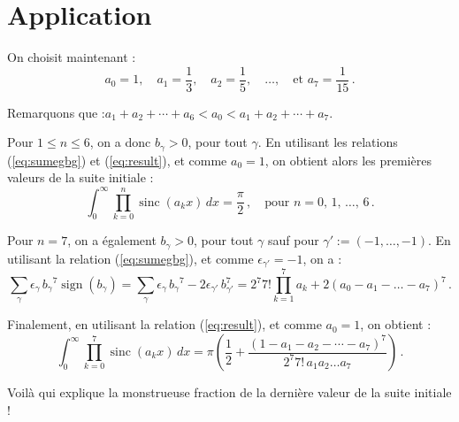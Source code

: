 \documentclass[a4paper,11pt]{article}
\newcommand{\g}{\ensuremath{\gamma}\xspace}
\newcommand{\bg}{\ensuremath{b_{\gamma}}\xspace}
\newcommand{\eg}{\ensuremath{\epsilon_{\gamma}}\xspace}
\DeclareMathOperator{\sinc}{sinc}
\DeclareMathOperator{\sign}{sign}
\begin{document}
\section{Application}

On choisit maintenant :
\[
  a_0=1,\quad a_1=\frac{1}{3},\quad a_2=\frac{1}{5},
  \quad\ldots,\quad \text{et }  a_7=\frac{1}{15} \,.
\]

Remarquons que :\quad $a_1+a_2+\cdots+a_6<a_0<a_1+a_2+\cdots+a_7$.

\medskip
Pour $1\le n\le6$, on a donc $\bg>0$, pour tout $\g$.
En utilisant les relations (\ref{eq:sumegbg}) et (\ref{eq:result}),
et comme $a_0=1$, on obtient alors les premières valeurs
de la suite initiale :
\[
  \int_0^\infty\prod_{k=0}^n \sinc(a_k x)\,dx = \frac{\pi}{2} \,,\quad
  \text{pour $n=0$, $1$, $\ldots$, $6$}\,.
\]

\medskip
Pour $n=7$, on a également $\bg>0$, pour tout $\g$ sauf pour
$\g':=(-1,\ldots,-1)$. En utilisant la relation (\ref{eq:sumegbg}),
et comme $\epsilon_{\g'}=-1$, on a :
\[
  \sum_\g \eg\,\bg^7\sign(\bg) =
  \sum_\g \eg\,\bg^7 - 2\epsilon_{\g'}\,b_{\g'}^7 =
  2^7 7! \prod_{k=1}^7 a_k + 2(a_0-a_1-\ldots-a_7)^7\,.
\]

Finalement, en utilisant la relation (\ref{eq:result}), et comme $a_0=1$,
on obtient :
\[
  \int_0^\infty\prod_{k=0}^7 \sinc(a_k x)\,dx = \pi \left(\frac{1}{2}
  +\frac{(1-a_1-a_2-\cdots-a_7)^7}{2^7 7!\,a_1a_2\ldots a_7}\right)\,.
\]

Voilà qui explique la monstrueuse fraction de la dernière valeur de la
suite initiale !
\end{document}
